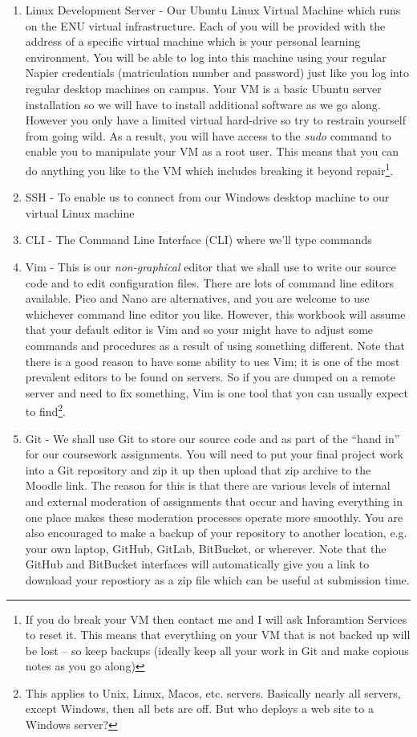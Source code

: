 \documentclass[12pt, a4paper, oneside]{book}
\begin{document}
\begin{enumerate}
\item Linux Development Server - Our Ubuntu Linux Virtual Machine which runs on the ENU virtual infrastructure. Each of you will be provided with the address of a specific virtual machine which is your personal learning environment. You will be able to log into this machine using your regular Napier credentials (matriculation number and password) just like you log into regular desktop machines on campus. Your VM is a basic Ubuntu server installation so we will have to install additional software as we go along. However you only have a limited virtual hard-drive so try to restrain yourself from going wild. As a result, you will have access to the \emph{sudo} command to enable you to manipulate your VM as a root user. This means that you can do anything you like to the VM which includes breaking it beyond repair\footnote{If you do break your VM then contact me and I will ask Inforamtion Services to reset it. This means that everything on your VM that is not backed up will be lost -- so keep backups (ideally keep all your work in Git and make copious notes as you go along)}.
\item SSH - To enable us to connect from our Windows desktop machine to our virtual Linux machine
\item CLI - The Command Line Interface (CLI) where we'll type commands
\item Vim - This is our \emph{non-graphical} editor that we shall use to write our source code and to edit configuration files. There are lots of command line editors available. Pico and Nano are alternatives, and you are welcome to use whichever command line editor you like. However, this workbook will assume that your default editor is Vim and so your might have to adjust some commands and procedures as a result of using something different. Note that there is a good reason to have some ability to ues Vim; it is one of the most prevalent editors to be found on servers. So if you are dumped on a remote server and need to fix something, Vim is one tool that you can usually expect to find\footnote{This applies to Unix, Linux, Macos, etc. servers. Basically nearly all servers, except Windows, then all bets are off. But who deploys a web site to a Windows server?}.
\item Git - We shall use Git to store our source code and as part of the ``hand in'' for our coursework assignments. You will need to put your final project work into a Git repository and zip it up then upload that zip archive to the Moodle link. The reason for this is that there are various levels of internal and external moderation of assignments that occur and having everything in one place makes these moderation processes operate more smoothly. You are also encouraged to make a backup of your repository to another location, e.g. your own laptop, GitHub, GitLab, BitBucket, or wherever. Note that the GitHub and BitBucket interfaces will automatically give you a link to download your repostiory as a zip file which can be useful at submission time.
\end{enumerate}
\end{document}
